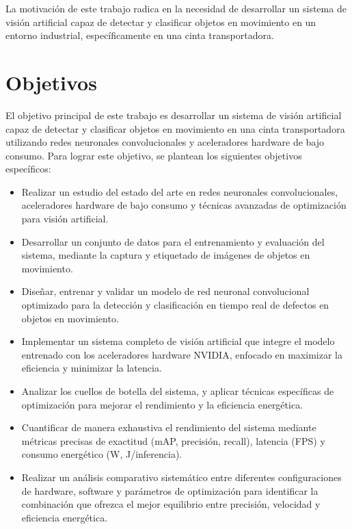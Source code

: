 \documentclass[11pt,spanish,listoffigures,listoftables]{tfgetsinf}
\begin{document}
La motivación de este trabajo radica en la necesidad de desarrollar un sistema de visión artificial capaz de detectar y clasificar objetos en movimiento en un entorno industrial, específicamente en una cinta transportadora.


\section{Objetivos}

El objetivo principal de este trabajo es desarrollar un sistema de visión artificial capaz de detectar y clasificar objetos en movimiento en una cinta transportadora utilizando redes neuronales convolucionales y aceleradores hardware de bajo consumo. Para lograr este objetivo, se plantean los siguientes objetivos específicos:

\begin{itemize}
   \item Realizar un estudio del estado del arte en redes neuronales convolucionales, aceleradores hardware de bajo consumo y técnicas avanzadas de optimización para visión artificial.
   \item Desarrollar un conjunto de datos para el entrenamiento y evaluación del sistema, mediante la captura y etiquetado de imágenes de objetos en movimiento.
   \item Diseñar, entrenar y validar un modelo de red neuronal convolucional optimizado para la detección y clasificación en tiempo real de defectos en objetos en movimiento.
   \item Implementar un sistema completo de visión artificial que integre el modelo entrenado con los aceleradores hardware NVIDIA, enfocado en maximizar la eficiencia y minimizar la latencia.
   \item Analizar los cuellos de botella del sistema, y aplicar técnicas específicas de optimización para mejorar el rendimiento y la eficiencia energética.
   \item Cuantificar de manera exhaustiva el rendimiento del sistema mediante métricas precisas de exactitud (mAP, precisión, recall), latencia (FPS) y consumo energético (W, J/inferencia).
   \item Realizar un análisis comparativo sistemático entre diferentes configuraciones de hardware, software y parámetros de optimización para identificar la combinación que ofrezca el mejor equilibrio entre precisión, velocidad y eficiencia energética.
\end{itemize}
\end{document}

